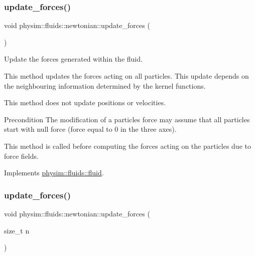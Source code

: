 \subsubsection{\texorpdfstring{update\+\_\+forces()}{update\_forces()}\hspace{0.1cm}{\footnotesize\ttfamily [1/2]}}
{\footnotesize\ttfamily void physim\+::fluids\+::newtonian\+::update\+\_\+forces (\begin{DoxyParamCaption}{ }\end{DoxyParamCaption})\hspace{0.3cm}{\ttfamily [virtual]}}



Update the forces generated within the fluid. 

This method updates the forces acting on all particles. This update depends on the neighbouring information determined by the kernel functions.

This method does not update positions or velocities.

\begin{DoxyPrecond}{Precondition}
The modification of a particles\textquotesingle{} force may assume that all particles start with null force (force equal to 0 in the three axes). 

This method is called before computing the forces acting on the particles due to force fields. 
\end{DoxyPrecond}


Implements \hyperlink{classphysim_1_1fluids_1_1fluid_a6cde063d44b1e33199c08e64d801bb04}{physim\+::fluids\+::fluid}.

\mbox{\label{classphysim_1_1fluids_1_1newtonian_a2ad3a26c489e0167f16cc4cd2ead981d}} 
\subsubsection{\texorpdfstring{update\+\_\+forces()}{update\_forces()}\hspace{0.1cm}{\footnotesize\ttfamily [2/2]}}
{\footnotesize\ttfamily void physim\+::fluids\+::newtonian\+::update\+\_\+forces (\begin{DoxyParamCaption}\item[{size\+\_\+t}]{n }\end{DoxyParamCaption})\hspace{0.3cm}{\ttfamily [virtual]}}



